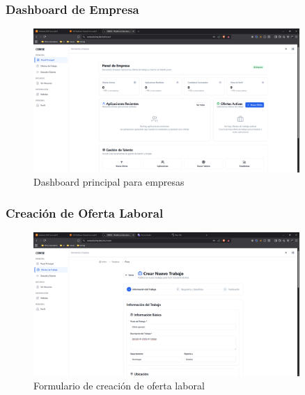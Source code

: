 \documentclass[12pt,a4paper]{article}
\begin{document}
\begin{enumerate}
\subsubsection{Dashboard de Empresa}
\begin{figure}[H]
    \centering
    \includegraphics[width=0.9\textwidth]{screenshots/companies/dashboard.png}
    \caption{Dashboard principal para empresas}
    \label{fig:company-dashboard}
\end{figure}

\subsubsection{Creación de Oferta Laboral}
\begin{figure}[H]
    \centering
    \includegraphics[width=0.9\textwidth]{screenshots/companies/create-job.png}
    \caption{Formulario de creación de oferta laboral}
    \label{fig:company-create-job}
\end{figure}


\end{enumerate}
\end{document}
